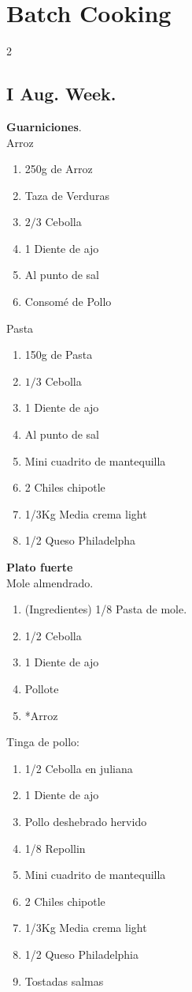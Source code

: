 \documentclass{article}
\begin{document}
\section*{Batch Cooking}
\begin{multicols}{2}

\subsection*{I Aug. Week.}

\textbf{Guarniciones}.\\

\noindent Arroz
\begin{enumerate}
    \item 250g de Arroz
    \item Taza de Verduras
    \item $2/3$ Cebolla
    \item 1 Diente de ajo
    \item Al punto de sal
    \item Consomé de Pollo
\end{enumerate}

\noindent Pasta
\begin{enumerate}
    \item 150g de Pasta
    \item $1/3$ Cebolla
    \item 1 Diente de ajo
    \item Al punto de sal
    \item Mini cuadrito de mantequilla
    \item 2 Chiles chipotle
    \item 1/3Kg Media crema light
    \item 1/2 Queso Philadelpha
\end{enumerate}

\textbf{Plato fuerte}\\

Mole almendrado.
\begin{enumerate}
    \item (Ingredientes) 1/8 Pasta de mole.
    \item 1/2 Cebolla
    \item 1 Diente de ajo
    \item Pollote
    \item *Arroz
    
\end{enumerate}


\noindent Tinga de pollo:
\begin{enumerate}
    \item 1/2 Cebolla en juliana
    \item 1 Diente de ajo
    \item Pollo deshebrado hervido
    \item 1/8 Repollin
    \item Mini cuadrito de mantequilla
    \item 2 Chiles chipotle
    \item 1/3Kg Media crema light
    \item 1/2 Queso Philadelphia
    \item Tostadas salmas
\end{enumerate}

\end{multicols}
\end{document}
